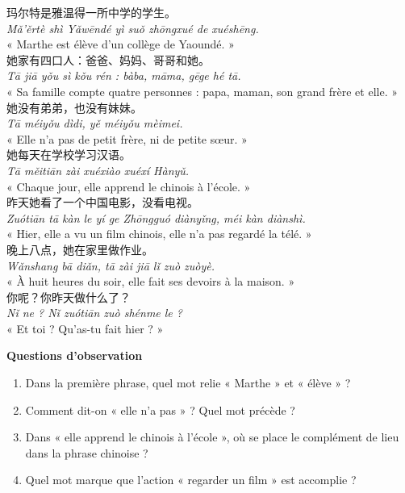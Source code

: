 \documentclass[11pt]{article}
\newcommand{\zh}[1]{\ifmmode\text{#1}\else{#1}\fi}
\begin{document}
\begin{textebox}
玛尔特是雅温得一所中学的学生。\\
\textit{Mǎ'ěrtè shì Yǎwēndé yì suǒ zhōngxué de xuéshēng.}\\
« Marthe est élève d'un collège de Yaoundé. »\\[0.3em]
她家有四口人：爸爸、妈妈、哥哥和她。\\
\textit{Tā jiā yǒu sì kǒu rén : bàba, māma, gēge hé tā.}\\
« Sa famille compte quatre personnes : papa, maman, son grand frère et elle. »\\[0.3em]
她没有弟弟，也没有妹妹。\\
\textit{Tā méiyǒu dìdi, yě méiyǒu mèimei.}\\
« Elle n'a pas de petit frère, ni de petite sœur. »\\[0.3em]
她每天在学校学习汉语。\\
\textit{Tā měitiān zài xuéxiào xuéxí Hànyǔ.}\\
« Chaque jour, elle apprend le chinois à l'école. »\\[0.3em]
昨天她看了一个中国电影，没看电视。\\
\textit{Zuótiān tā kàn le yí ge Zhōngguó diànyǐng, méi kàn diànshì.}\\
« Hier, elle a vu un film chinois, elle n'a pas regardé la télé. »\\[0.3em]
晚上八点，她在家里做作业。\\
\textit{Wǎnshang bā diǎn, tā zài jiā lǐ zuò zuòyè.}\\
« À huit heures du soir, elle fait ses devoirs à la maison. »\\[0.3em]
你呢？你昨天做什么了？\\
\textit{Nǐ ne ? Nǐ zuótiān zuò shénme le ?}\\
« Et toi ? Qu'as-tu fait hier ? »
\end{textebox}

\textbf{Questions d'observation}
\begin{enumerate}
\item Dans la première phrase, quel mot relie « Marthe » et « élève » ?
\item Comment dit-on « elle n'a pas » ? Quel mot précède \zh{有} ?
\item Dans « elle apprend le chinois à l'école », où se place le complément de lieu \zh{在学校} dans la phrase chinoise ?
\item Quel mot marque que l'action « regarder un film » est accomplie ?
\end{enumerate}
\end{document}

